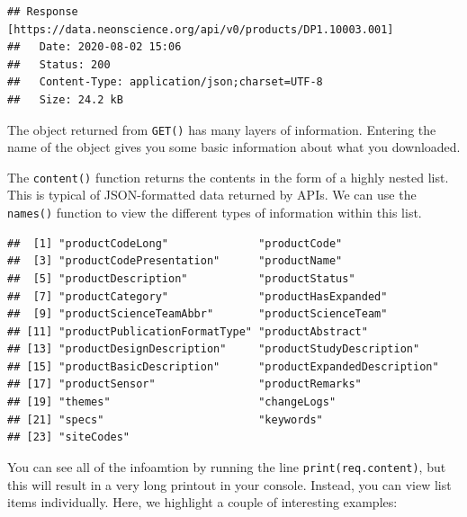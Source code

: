 \documentclass[]{book}
\newenvironment{Shaded}{\begin{snugshade}}{\end{snugshade}}
\newcommand{\CommentTok}[1]{\textcolor[rgb]{0.56,0.35,0.01}{\textit{#1}}}
\newcommand{\DataTypeTok}[1]{\textcolor[rgb]{0.13,0.29,0.53}{#1}}
\newcommand{\KeywordTok}[1]{\textcolor[rgb]{0.13,0.29,0.53}{\textbf{#1}}}
\newcommand{\NormalTok}[1]{#1}
\newcommand{\OperatorTok}[1]{\textcolor[rgb]{0.81,0.36,0.00}{\textbf{#1}}}
\newcommand{\StringTok}[1]{\textcolor[rgb]{0.31,0.60,0.02}{#1}}
\begin{document}
\begin{verbatim}
## Response [https://data.neonscience.org/api/v0/products/DP1.10003.001]
##   Date: 2020-08-02 15:06
##   Status: 200
##   Content-Type: application/json;charset=UTF-8
##   Size: 24.2 kB
\end{verbatim}

The object returned from \texttt{GET()} has many layers of information. Entering the
name of the object gives you some basic information about what you downloaded.

The \texttt{content()} function returns the contents in the form of a highly nested
list. This is typical of JSON-formatted data returned by APIs. We can use the
\texttt{names()} function to view the different types of information within this list.

\begin{Shaded}
\end{Shaded}

\begin{verbatim}
##  [1] "productCodeLong"              "productCode"                 
##  [3] "productCodePresentation"      "productName"                 
##  [5] "productDescription"           "productStatus"               
##  [7] "productCategory"              "productHasExpanded"          
##  [9] "productScienceTeamAbbr"       "productScienceTeam"          
## [11] "productPublicationFormatType" "productAbstract"             
## [13] "productDesignDescription"     "productStudyDescription"     
## [15] "productBasicDescription"      "productExpandedDescription"  
## [17] "productSensor"                "productRemarks"              
## [19] "themes"                       "changeLogs"                  
## [21] "specs"                        "keywords"                    
## [23] "siteCodes"
\end{verbatim}

You can see all of the infoamtion by running the line \texttt{print(req.content)}, but
this will result in a very long printout in your console. Instead, you can view
list items individually. Here, we highlight a couple of interesting examples:

\begin{Shaded}
\end{Shaded}
\end{document}
